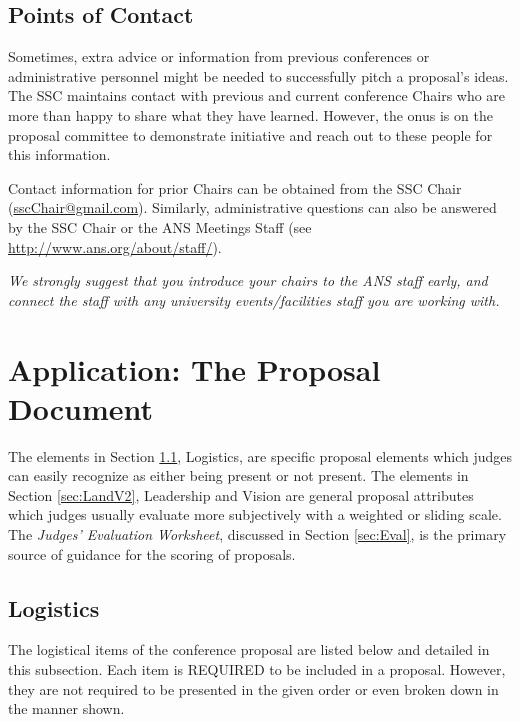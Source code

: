 \documentclass[12pt]{article}
\begin{document}
\subsection{Points of Contact}\label{sec:points_of_contact}
Sometimes, extra advice or information from previous conferences or administrative personnel might be needed to successfully pitch a proposal's ideas. The SSC maintains contact with previous and current conference Chairs who are more than happy to share what they have learned. However, the onus is on the proposal committee to demonstrate initiative and reach out to these people for this information.

Contact information for prior Chairs can be obtained from the SSC Chair (\href{mailto:sscChair@gmail.com}{sscChair@gmail.com}). Similarly, administrative questions can also be answered by the SSC Chair or the ANS Meetings Staff (see \href{http://www.ans.org/about/staff/}{http://www.ans.org/about/staff/}).

\textit{We strongly suggest that you introduce your chairs to the ANS staff early, and connect the staff with any university events/facilities staff you are working with.}

\clearpage
\section{Application: The Proposal Document} \label{sec:TheProposal}
The elements in Section \ref{sec:Logistics}, Logistics, are specific proposal elements which judges can easily recognize as either being present or not present. The elements in Section \ref{sec:LandV2}, Leadership and Vision  are general proposal attributes which judges usually evaluate more subjectively with a weighted or sliding scale. The \textit{Judges’ Evaluation Worksheet}, discussed in Section \ref{sec:Eval}, is the primary source of guidance for the scoring of proposals.

\subsection{Logistics} \label{sec:Logistics}
The logistical items of the conference proposal are listed below and detailed in this subsection. Each item is REQUIRED to be included in a proposal. However, they are not required to be presented in the given order or even broken down in the manner shown.
\end{document}
